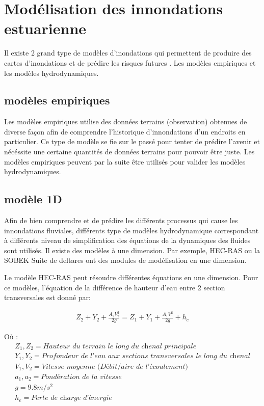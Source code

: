 \documentclass[12pt]{article}   %
\begin{document}
\section{Modélisation des innondations estuarienne}

Il existe 2 grand type de modèles d'inondations qui permettent de produire des cartes d'inondations et de prédire les risques futures \cite{Teng2017}. Les modèles empiriques et les modèles hydrodynamiques.
    
\subsection{modèles empiriques}

Les modèles empiriques utilise des données terrains (observation) obtenues de diverse façon afin de comprendre l'historique d'innondations d'un endroits en particulier. Ce type de modèle se fie sur le passé pour tenter de prédire l'avenir et nécéssite une certaine quantités de données terrains pour pouvoir être juste. Les modèles empiriques peuvent par la suite être utilisés pour valider les modèles hydrodynamiques.

\subsection{modèle 1D}
  
  Afin de bien comprendre et de prédire les différents processus qui cause les innondations fluviales, différents type de modèles hydrodynamique correspondant à différents niveau de simplification des équations de la dynamiques des fluides sont utilisés. Il existe des modèles à une dimension. Par exemple, HEC-RAS ou la SOBEK Suite de deltares ont des modules de modélisation en une dimension. 
  
  Le modèle HEC-RAS peut résoudre différentes équations en une dimension. Pour ce modèles, l'équation de la différence de hauteur d'eau entre 2 section transversales est donné par: 
    
    \begin{align}
        Z_2 +Y_2+\frac{A_2 V_2^2}{2g} = Z_1 +Y_1+\frac{A_1 V_1^2}{2g}+ h_e
    \end{align}
    
    Où : 
    \begin{align}
     Z_1,Z_2 = \textit{Hauteur du terrain le long du chenal principale}\\
     Y_1,Y_2 = \textit{Profondeur de l'eau aux sections transversales le long du chenal}\\
     V_1,V_2 = \textit{Vitesse moyenne (Débit/aire de l'écoulement)}\\
     a_1,a_2 = \textit{Pondération de la vitesse}\\
     g = 9.8 m/s^2\\
     h_e = \textit{Perte de charge d'énergie} 
    \end{align}
    
\end{document}
